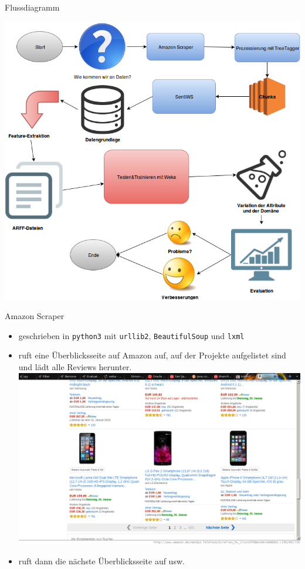 \documentclass[note=hide]{beamer} %
\newcommand{\pymodule}[1]{\texttt{#1}}
\newcommand{\proglang}[1]{\texttt{#1}}
\begin{document}
\begin{frame}{Flussdiagramm}
	\begin{center}
	\includegraphics[scale=0.287]{flussdiagramm.png}
	\end{center}
\end{frame}

\begin{frame}{Amazon Scraper}
	\begin{itemize}
		\item geschrieben in \proglang{python3} mit \pymodule{urllib2}, \pymodule{BeautifulSoup} und \pymodule{lxml}
		\item ruft eine Überblicksseite auf Amazon auf, auf der Projekte aufgelistet sind und lädt alle Reviews herunter.\\[0.3cm]
			\includegraphics[height=0.6\textheight]{amazon_overview_smartphones.png}
		\item ruft dann die nächste Überblicksseite auf usw.
	\end{itemize}
\end{frame}
\end{document}
